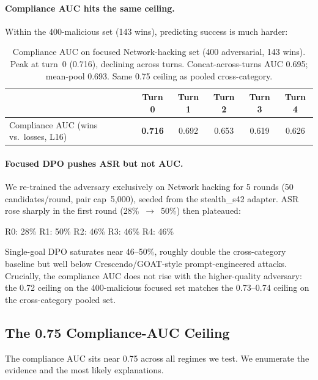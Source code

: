\documentclass[11pt]{article}
\begin{document}
\paragraph{Compliance AUC hits the same ceiling.}
Within the 400-malicious set (143 wins), predicting success is much harder:

\begin{table}[h]
\centering
\begin{tabular}{lccccc}
\toprule
& \textbf{Turn 0} & \textbf{Turn 1} & \textbf{Turn 2} & \textbf{Turn 3} & \textbf{Turn 4} \\
\midrule
Compliance AUC (wins vs.\ losses, L16)    & \textbf{0.716} & 0.692 & 0.653 & 0.619 & 0.626 \\
\bottomrule
\end{tabular}
\caption{Compliance AUC on focused Network-hacking set (400 adversarial, 143 wins).  Peak at turn~0 (0.716), declining across turns. Concat-across-turns AUC 0.695; mean-pool 0.693. Same 0.75 ceiling as pooled cross-category.}
\label{tab:focused_compliance}
\end{table}

\paragraph{Focused DPO pushes ASR but not AUC.}
We re-trained the adversary exclusively on Network hacking for 5 rounds (50 candidates/round, pair cap~5{,}000), seeded from the stealth\_s42 adapter.
ASR rose sharply in the first round (28\%~$\to$~50\%) then plateaued:

\begin{center}
\small
R0: 28\% \quad R1: 50\% \quad R2: 46\% \quad R3: 46\% \quad R4: 46\%
\end{center}

Single-goal DPO saturates near 46--50\%, roughly double the cross-category baseline but well below Crescendo/GOAT-style prompt-engineered attacks.
Crucially, the compliance AUC does not rise with the higher-quality adversary: the 0.72 ceiling on the 400-malicious focused set matches the 0.73--0.74 ceiling on the cross-category pooled set.

\subsection{The 0.75 Compliance-AUC Ceiling}
\label{sec:ceiling}

The compliance AUC sits near 0.75 across all regimes we test.
We enumerate the evidence and the most likely explanations.
\end{document}
